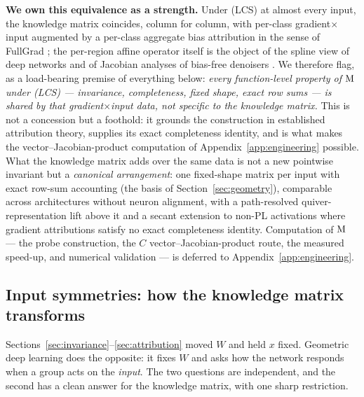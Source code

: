 \textbf{We own this equivalence as a strength.} Under (LCS) at almost every
input, the knowledge matrix coincides, column for column, with per-class
gradient$\times$input \citep{shrikumar2016not,ancona2018towards} augmented by a
per-class aggregate bias attribution in the sense of FullGrad
\citep{srinivas2019full}; the per-region affine operator itself is the object of
the spline view of deep networks \citep{balestriero2018spline} and of Jacobian
analyses of bias-free denoisers \citep{mohan2020robust}. We therefore flag, as a
load-bearing premise of everything below: \emph{every function-level property of
$\mathrm{M}$ under (LCS) --- invariance, completeness, fixed shape, exact row sums --- is
shared by that gradient$\times$input data, not specific to the knowledge
matrix.} This is not a concession but a foothold: it grounds the construction in
established attribution theory, supplies its exact completeness identity, and is
what makes the vector--Jacobian-product computation of Appendix~\ref{app:engineering}
possible. What the knowledge matrix adds over the same data is not a new
pointwise invariant but a \emph{canonical arrangement}: one fixed-shape matrix
per input with exact row-sum accounting (the basis of
Section~\ref{sec:geometry}), comparable across architectures without neuron
alignment, with a path-resolved quiver-representation lift above it
\citep{armenta2021representation,armenta2022double} and a secant extension to
non-PL activations where gradient attributions satisfy no exact completeness
identity.  Computation of $\mathrm{M}$ --- the probe construction, the $C$
vector--Jacobian-product route, the measured speed-up, and numerical validation
--- is deferred to Appendix~\ref{app:engineering}.

\subsection{Input symmetries: how the knowledge matrix transforms}
\label{sec:equivariance}

Sections~\ref{sec:invariance}--\ref{sec:attribution} moved $W$ and held $x$
fixed. Geometric deep learning \citep{bronstein2021geometric} does the opposite:
it fixes $W$ and asks how the network responds when a group acts on the
\emph{input}. The two questions are independent, and the second has a clean
answer for the knowledge matrix, with one sharp restriction.


